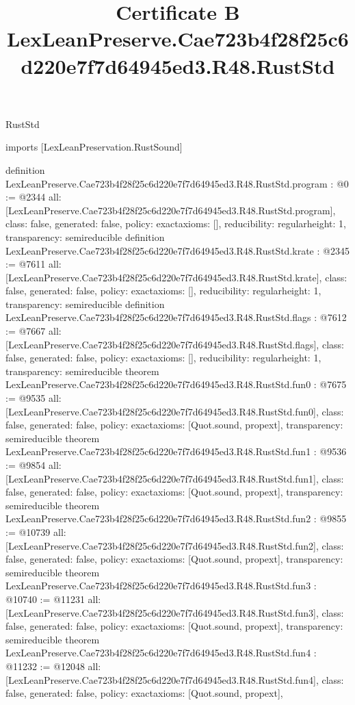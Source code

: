 \begin{lexlean}{RustStd}
\title{Certificate B LexLeanPreserve.Cae723b4f28f25c6d220e7f7d64945ed3.R48.RustStd}
\begin{coremodule}
imports [LexLeanPreservation.RustSound]

definition LexLeanPreserve.Cae723b4f28f25c6d220e7f7d64945ed3.R48.RustStd.program : @0 := @2344 {
  all: [LexLeanPreserve.Cae723b4f28f25c6d220e7f7d64945ed3.R48.RustStd.program],
  class: false,
  generated: false,
  policy: exact{axioms: []},
  reducibility: regular{height: 1},
  transparency: semireducible
}
definition LexLeanPreserve.Cae723b4f28f25c6d220e7f7d64945ed3.R48.RustStd.krate : @2345 := @7611 {
  all: [LexLeanPreserve.Cae723b4f28f25c6d220e7f7d64945ed3.R48.RustStd.krate],
  class: false,
  generated: false,
  policy: exact{axioms: []},
  reducibility: regular{height: 1},
  transparency: semireducible
}
definition LexLeanPreserve.Cae723b4f28f25c6d220e7f7d64945ed3.R48.RustStd.flags : @7612 := @7667 {
  all: [LexLeanPreserve.Cae723b4f28f25c6d220e7f7d64945ed3.R48.RustStd.flags],
  class: false,
  generated: false,
  policy: exact{axioms: []},
  reducibility: regular{height: 1},
  transparency: semireducible
}
theorem LexLeanPreserve.Cae723b4f28f25c6d220e7f7d64945ed3.R48.RustStd.fun0 : @7675 := @9535 {
  all: [LexLeanPreserve.Cae723b4f28f25c6d220e7f7d64945ed3.R48.RustStd.fun0],
  class: false,
  generated: false,
  policy: exact{axioms: [Quot.sound, propext]},
  transparency: semireducible
}
theorem LexLeanPreserve.Cae723b4f28f25c6d220e7f7d64945ed3.R48.RustStd.fun1 : @9536 := @9854 {
  all: [LexLeanPreserve.Cae723b4f28f25c6d220e7f7d64945ed3.R48.RustStd.fun1],
  class: false,
  generated: false,
  policy: exact{axioms: [Quot.sound, propext]},
  transparency: semireducible
}
theorem LexLeanPreserve.Cae723b4f28f25c6d220e7f7d64945ed3.R48.RustStd.fun2 : @9855 := @10739 {
  all: [LexLeanPreserve.Cae723b4f28f25c6d220e7f7d64945ed3.R48.RustStd.fun2],
  class: false,
  generated: false,
  policy: exact{axioms: [Quot.sound, propext]},
  transparency: semireducible
}
theorem LexLeanPreserve.Cae723b4f28f25c6d220e7f7d64945ed3.R48.RustStd.fun3 : @10740 := @11231 {
  all: [LexLeanPreserve.Cae723b4f28f25c6d220e7f7d64945ed3.R48.RustStd.fun3],
  class: false,
  generated: false,
  policy: exact{axioms: [Quot.sound, propext]},
  transparency: semireducible
}
theorem LexLeanPreserve.Cae723b4f28f25c6d220e7f7d64945ed3.R48.RustStd.fun4 : @11232 := @12048 {
  all: [LexLeanPreserve.Cae723b4f28f25c6d220e7f7d64945ed3.R48.RustStd.fun4],
  class: false,
  generated: false,
  policy: exact{axioms: [Quot.sound, propext]},
}
\end{coremodule}
\end{lexlean}

